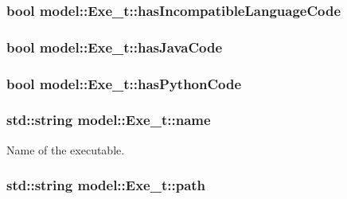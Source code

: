 \subsubsection[{\texorpdfstring{has\+Incompatible\+Language\+Code}{hasIncompatibleLanguageCode}}]{\setlength{\rightskip}{0pt plus 5cm}bool model\+::\+Exe\+\_\+t\+::has\+Incompatible\+Language\+Code}\hypertarget{structmodel_1_1_exe__t_a6be6a5fb6d2bd67252bc482e0f73d653}{}\label{structmodel_1_1_exe__t_a6be6a5fb6d2bd67252bc482e0f73d653}
\subsubsection[{\texorpdfstring{has\+Java\+Code}{hasJavaCode}}]{\setlength{\rightskip}{0pt plus 5cm}bool model\+::\+Exe\+\_\+t\+::has\+Java\+Code}\hypertarget{structmodel_1_1_exe__t_afde7d37313d19a5e7d94d8a437bd5f23}{}\label{structmodel_1_1_exe__t_afde7d37313d19a5e7d94d8a437bd5f23}
\subsubsection[{\texorpdfstring{has\+Python\+Code}{hasPythonCode}}]{\setlength{\rightskip}{0pt plus 5cm}bool model\+::\+Exe\+\_\+t\+::has\+Python\+Code}\hypertarget{structmodel_1_1_exe__t_a1f503ee849b2fdc09398412d680c601f}{}\label{structmodel_1_1_exe__t_a1f503ee849b2fdc09398412d680c601f}
\subsubsection[{\texorpdfstring{name}{name}}]{\setlength{\rightskip}{0pt plus 5cm}std\+::string model\+::\+Exe\+\_\+t\+::name}\hypertarget{structmodel_1_1_exe__t_a1296e03bcfe765f9739607b265485955}{}\label{structmodel_1_1_exe__t_a1296e03bcfe765f9739607b265485955}


Name of the executable. 

\subsubsection[{\texorpdfstring{path}{path}}]{\setlength{\rightskip}{0pt plus 5cm}std\+::string model\+::\+Exe\+\_\+t\+::path}\hypertarget{structmodel_1_1_exe__t_a64ab662ba17fe95f229b11a848ddc0bf}{}\label{structmodel_1_1_exe__t_a64ab662ba17fe95f229b11a848ddc0bf}


